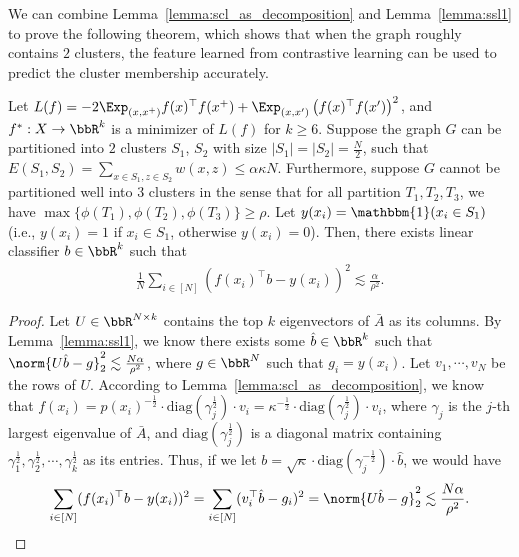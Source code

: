We can combine Lemma~\ref{lemma:scl_as_decomposition} and Lemma~\ref{lemma:ssl1} to prove the following theorem, which shows that when the graph roughly contains $2$ clusters, the feature learned from contrastive learning can be used to predict the cluster membership accurately. 
\begin{theorem}\label{theorem:scl}
	Let $L(f) = -2\Exp_{(x, x^+) } f(x)^\top f(x^+) + \Exp_{(x, x') } \left(f(x)^\top f(x')\right)^2$, and $f^*: X\rightarrow \bbR^k$ is a minimizer of $L(f)$ for $k\ge 6$. Suppose the graph $G$ can be partitioned into $2$ clusters $S_1$, $S_2$ with size $|S_1| = |S_2| = \frac{N}{2}$, such that $E(S_1, S_2)=\sum_{x\in S_1, z\in S_2} w(x, z) \le \alpha \kappa N$. Furthermore, suppose $G$ cannot be partitioned well into $3$ clusters in the sense that for all partition $ T_1, T_2, T_3$, we have $\max\{\phi(T_1), \phi(T_2), \phi(T_3)\} \ge \rho$. Let $y(x_i) = \mathbbm{1}(x_i\in S_1)$ (i.e., $y(x_i)=1$ if $x_i\in S_1$, otherwise $y(x_i)=0$). Then, there exists linear classifier $b\in\bbR^k$ such that
	\begin{align}
		\frac{1}{N}\sum_{i\in [N]} \left(f(x_i)^\top b - y(x_i)\right)^2 \lesssim \frac{\alpha}{\rho^2}.
	\end{align}
\end{theorem}
\begin{proof}
	Let $U\in\bbR^{N\times k}$ contains the top $k$ eigenvectors of $\bar{A}$ as its columns. By Lemma~\ref{lemma:ssl1}, we know there exists some $\hat{b}\in\bbR^k$ such that $\norm{U\hat{b}-g}_2^2 \lesssim \frac{N\alpha}{\rho^2}$, where $g\in\bbR^N$ such that $g_i = y(x_i)$. Let $v_1, \cdots, v_N$ be the rows of $U$. According to Lemma~\ref{lemma:scl_as_decomposition}, we know that $f(x_i)= p(x_i)^{-\frac{1}{2}} \cdot \text{diag}(\gamma_j^{\frac{1}{2}}) \cdot v_i = \kappa^{-\frac{1}{2}}\cdot \text{diag}(\gamma_j^{\frac{1}{2}}) \cdot v_i$, where $\gamma_j$ is the $j$-th largest eigenvalue of $\bar{A}$, and $\text{diag}(\gamma_j^{\frac{1}{2}})$ is a diagonal matrix containing $\gamma_1^\frac{1}{2}, \gamma_2^{\frac{1}{2}}, \cdots, \gamma_k^{\frac{1}{2}}$ as its entries. Thus, if we let $b=\sqrt{\kappa}\cdot  \text{diag}(\gamma_j^{-\frac{1}{2}}) \cdot \hat{b}$, we would have 
	\begin{align}
\sum_{i\in[N]} (f(x_i)^\top b - y(x_i))^2 = \sum_{i\in[N]} (v_i^\top \hat{b} - g_i)^2 = \norm{U\hat{b}-g}_2^2 \lesssim \frac{N\alpha}{\rho^2}.
	\end{align}
\end{proof}
